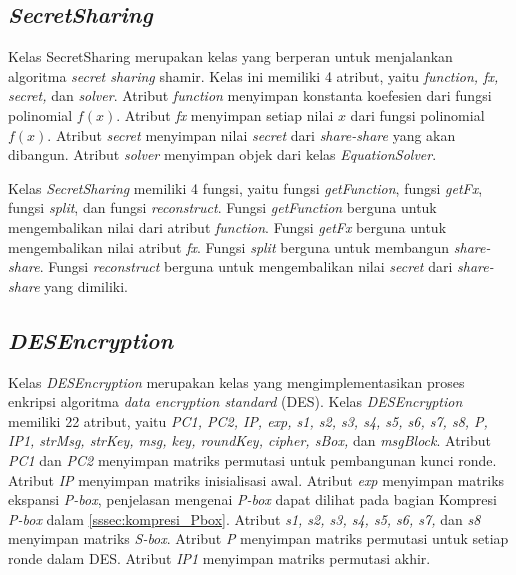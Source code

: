 \subsection{\textit{SecretSharing}}

Kelas SecretSharing merupakan kelas yang berperan untuk menjalankan algoritma \textit{secret sharing} shamir. Kelas ini memiliki 4 atribut, yaitu \textit{function, fx, secret,} dan \textit{solver}. Atribut \textit{function} menyimpan konstanta koefesien dari fungsi polinomial \begin{math}f(x)\end{math}. Atribut \textit{fx} menyimpan setiap nilai \begin{math}x\end{math} dari fungsi polinomial \begin{math}f(x)\end{math}. Atribut \textit{secret} menyimpan nilai \textit{secret} dari \textit{share-share} yang akan dibangun. Atribut \textit{solver} menyimpan objek dari kelas \textit{EquationSolver}.

Kelas \textit{SecretSharing} memiliki 4 fungsi, yaitu fungsi \textit{getFunction}, fungsi \textit{getFx}, fungsi \textit{split}, dan fungsi \textit{reconstruct}. Fungsi \textit{getFunction} berguna untuk mengembalikan nilai dari atribut \textit{function}. Fungsi \textit{getFx} berguna untuk mengembalikan nilai atribut \textit{fx}. Fungsi \textit{split} berguna untuk membangun \textit{share-share}. Fungsi \textit{reconstruct} berguna untuk mengembalikan nilai \textit{secret} dari \textit{share-share} yang dimiliki.

\subsection{\textit{DESEncryption}}

Kelas \textit{DESEncryption} merupakan kelas yang mengimplementasikan proses enkripsi algoritma \textit{data encryption standard} (DES). Kelas \textit{DESEncryption} memiliki 22 atribut, yaitu \textit{PC1, PC2, IP, exp, s1, s2, s3, s4, s5, s6, s7, s8, P, IP1, strMsg, strKey, msg, key, roundKey, cipher, sBox,} dan \textit{msgBlock}. Atribut \textit{PC1} dan \textit{PC2} menyimpan matriks permutasi untuk pembangunan kunci ronde. Atribut \textit{IP} menyimpan matriks inisialisasi awal. Atribut \textit{exp} menyimpan matriks ekspansi \textit{P-box}, penjelasan mengenai \textit{P-box} dapat dilihat pada bagian Kompresi \textit{P-box} dalam \ref{sssec:kompresi_Pbox}. Atribut \textit{s1, s2, s3, s4, s5, s6, s7,} dan \textit{s8} menyimpan matriks \textit{S-box}. Atribut \textit{P} menyimpan matriks permutasi untuk setiap ronde dalam DES. Atribut \textit{IP1} menyimpan matriks permutasi akhir.

